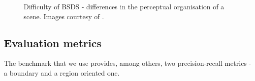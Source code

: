 \begin{figure}[ht!]
\centering
\caption[Difficulty of BSDS - differences in the perceptual organisation of a scene]{Difficulty of BSDS - differences in the perceptual organisation of a scene. Images courtesy of \cite{Li2013SemanticBenchmark}.}
\label{fig:BSDS-perceptual}
\end{figure}

\subsection{Evaluation metrics}
The benchmark that we use provides, among others, two precision-recall metrics - a boundary and a region oriented one.


